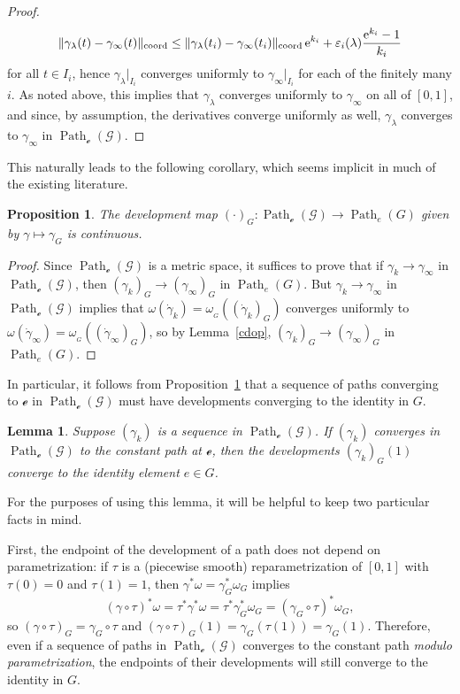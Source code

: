 \documentclass[pdftex]{sigma}
\numberwithin{equation}{section}
\newtheorem{Lemma}[Theorem]{Lemma}
\newtheorem{Proposition}[Theorem]{Proposition}
\theoremstyle{definition}
\DeclareMathOperator{\Path}{Path}
\newcommand{\MC}[1]{\omega_{{}_{#1}}}
\begin{document}
\begin{proof}
\[\|\gamma_\lambda(t)-\gamma_\infty(t)\|_\text{coord}\leq\|\gamma_\lambda(t_i)-\gamma_\infty(t_i)\|_\text{coord}\,{\rm e}^{k_i}+\varepsilon_i(\lambda)\frac{{\rm e}^{k_i}-1}{k_i}\]
for all $t\in I_i$, hence $\gamma_\lambda|_{I_i}$ converges uniformly to $\gamma_\infty|_{I_i}$ for each of the finitely many $i$. As noted above, this implies that $\gamma_\lambda$ converges uniformly to $\gamma_\infty$ on all of $[0,1]$, and since, by assumption, the derivatives converge uniformly as well, $\gamma_\lambda$ converges to $\gamma_\infty$ in $\Path_\mathscr{e}(\mathscr{G})$.\end{proof}

This naturally leads to the following corollary, which seems implicit in much of the existing literature.

\begin{Proposition}\label{devcont} The development map $(\cdot)_G\colon \Path_\mathscr{e}(\mathscr{G})\to\Path_e(G)$ given by $\gamma\mapsto\gamma_G$ is continuous.\end{Proposition}
\begin{proof}Since $\Path_\mathscr{e}(\mathscr{G})$ is a metric space, it suffices to prove that if $\gamma_k\rightarrow\gamma_\infty$ in $\Path_\mathscr{e}(\mathscr{G})$, then $(\gamma_k)_G\rightarrow(\gamma_\infty)_G$ in $\Path_e(G)$. But $\gamma_k\rightarrow\gamma_\infty$ in $\Path_\mathscr{e}(\mathscr{G})$ implies that $\omega(\dot{\gamma}_k)=\MC{G}((\dot{\gamma}_k)_G)$ converges uniformly to $\omega(\dot{\gamma}_\infty)=\MC{G}((\dot{\gamma}_\infty)_G)$, so by Lemma~\ref{cdop}, $(\gamma_k)_G\rightarrow(\gamma_\infty)_G$ in $\Path_e(G)$. \end{proof}

In particular, it follows from Proposition~\ref{devcont} that a sequence of paths converging to $\mathscr{e}$ in $\Path_\mathscr{e}(\mathscr{G})$ must have developments converging to the identity in $G$.

\begin{Lemma}\label{shrinkingholonomy}Suppose $(\gamma_k)$ is a sequence in $\Path_\mathscr{e}(\mathscr{G})$. If $(\gamma_k)$ converges in $\Path_\mathscr{e}(\mathscr{G})$ to the constant path at $\mathscr{e}$, then the developments $(\gamma_k)_G(1)$ converge to the identity element $e\in G$.\end{Lemma}

For the purposes of using this lemma, it will be helpful to keep two particular facts in mind.

First, the endpoint of the development of a path does not depend on parametrization: if $\tau$ is a (piecewise smooth) reparametrization of $[0,1]$ with $\tau(0)=0$ and $\tau(1)=1$, then $\gamma^*\omega=\gamma_G^*\omega_G$ implies \[(\gamma\circ\tau)^*\omega=\tau^*\gamma^*\omega=\tau^*\gamma_G^*\omega_G=(\gamma_G\circ\tau)^*\omega_G,\] so $(\gamma\circ\tau)_G=\gamma_G\circ\tau$ and $(\gamma\circ\tau)_G(1)=\gamma_G(\tau(1))=\gamma_G(1)$. Therefore, even if a sequence of paths in $\Path_\mathscr{e}(\mathscr{G})$ converges to the constant path \textit{modulo parametrization}, the endpoints of their developments will still converge to the identity in $G$.
\end{document}
